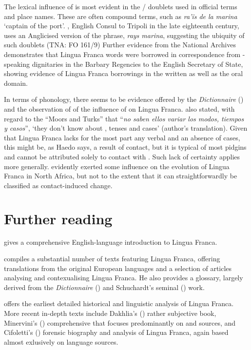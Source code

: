 \documentclass[output=paper]{langsci/langscibook}
\begin{document}
	The lexical influence of  is most evident in the / doublets used in official terms and place names. These are often compound terms, such as \textit{ra’ïs de la marina} ‘captain of the port’. , English Consul to Tripoli in the late eighteenth century, uses an Anglicised version of the phrase, \textit{rays marina}, suggesting the ubiquity of such doublets (TNA: FO 161/9) Further evidence from the National Archives \citep{Hopkins1982} demonstrates that Lingua Franca words were borrowed in correspondence from -speaking dignitaries in the Barbary Regencies to the English Secretary of State, showing evidence of Lingua Franca borrowings in the written as well as the oral domain. 
	
	In terms of phonology, there seems to be evidence offered by the \textit{Dictionnaire} (\citeyear{Anonymous1830}) and the observation of \citet{Haedo1612} of the influence of  on Lingua Franca. \citet[24]{Haedo1612} also stated, with regard to the ``Moors and Turks'' that ``\textit{no saben ellos variar los modos, tiempos y casos}'', ‘they don’t know about , tenses and cases’ (author's translation). Given that Lingua Franca lacks for the most part any verbal  and an absence of cases, this might be, as Haedo says, a result of contact, but it is typical of most pidgins and cannot be attributed solely to contact with . Such lack of certainty applies more generally.  evidently exerted some influence on the evolution of Lingua Franca in North Africa, but not to the extent that it can straightforwardly be classified as contact-induced change.
	
\section*{Further reading}
	
	\citet{Nolan2018} gives a comprehensive English-language introduction to Lingua Franca.
	
	\citet{Corré2005} compiles a substantial number of texts featuring Lingua Franca, offering translations from the original European languages and a selection of articles analysing and contexualising Lingua Franca. He also provides a glossary, largely derived from the \textit{Dictionnaire} (\citeyear{Anonymous1830}) and Schuchardt’s seminal (\citeyear{Schuchardt1909}) work.
	
	\citet{Schuchardt1909} offers the earliest detailed historical and linguistic analysis of Lingua Franca. More recent in-depth texts include Dakhlia's (\citeyear{Dakhlia2008}) rather subjective book, Minervini's (\citeyear{Minervini1996}) comprehensive  that focuses predominantly on  and  sources, and Cifoletti's (\citeyear{Cifoletti2004}) forensic biography and analysis of Lingua Franca, again based almost exlusively on  language sources. 
	
\end{document}

